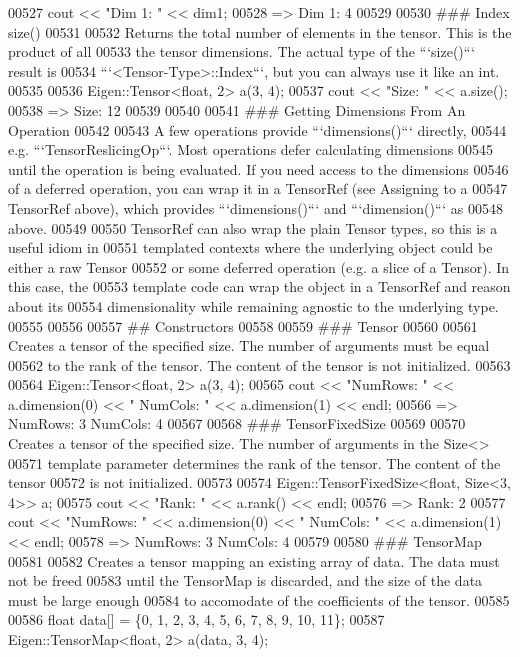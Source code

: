 \begin{DoxyCode}
00527       cout << "Dim 1: " << dim1;
00528       => Dim 1: 4
00529 
00530 ### Index size()
00531 
00532 Returns the total number of elements in the tensor.  This is the product of all
00533 the tensor dimensions.  The actual type of the ```size()``` result is
00534 ```<Tensor-Type>::Index```, but you can always use it like an int.
00535 
00536     Eigen::Tensor<float, 2> a(3, 4);
00537     cout << "Size: " << a.size();
00538     => Size: 12
00539 
00540 
00541 ### Getting Dimensions From An Operation
00542 
00543 A few operations provide ```dimensions()``` directly,
00544 e.g. ```TensorReslicingOp```.  Most operations defer calculating dimensions
00545 until the operation is being evaluated.  If you need access to the dimensions
00546 of a deferred operation, you can wrap it in a TensorRef (see Assigning to a
00547 TensorRef above), which provides ```dimensions()``` and ```dimension()``` as
00548 above.
00549 
00550 TensorRef can also wrap the plain Tensor types, so this is a useful idiom in
00551 templated contexts where the underlying object could be either a raw Tensor
00552 or some deferred operation (e.g. a slice of a Tensor).  In this case, the
00553 template code can wrap the object in a TensorRef and reason about its
00554 dimensionality while remaining agnostic to the underlying type.
00555 
00556 
00557 ## Constructors
00558 
00559 ### Tensor
00560 
00561 Creates a tensor of the specified size. The number of arguments must be equal
00562 to the rank of the tensor. The content of the tensor is not initialized.
00563 
00564     Eigen::Tensor<float, 2> a(3, 4);
00565     cout << "NumRows: " << a.dimension(0) << " NumCols: " << a.dimension(1) << endl;
00566     => NumRows: 3 NumCols: 4
00567 
00568 ### TensorFixedSize
00569 
00570 Creates a tensor of the specified size. The number of arguments in the Size<>
00571 template parameter determines the rank of the tensor. The content of the tensor
00572 is not initialized.
00573 
00574     Eigen::TensorFixedSize<float, Size<3, 4>> a;
00575     cout << "Rank: " << a.rank() << endl;
00576     => Rank: 2
00577     cout << "NumRows: " << a.dimension(0) << " NumCols: " << a.dimension(1) << endl;
00578     => NumRows: 3 NumCols: 4
00579 
00580 ### TensorMap
00581 
00582 Creates a tensor mapping an existing array of data. The data must not be freed
00583 until the TensorMap is discarded, and the size of the data must be large enough
00584 to accomodate of the coefficients of the tensor.
00585 
00586     float data[] = \{0, 1, 2, 3, 4, 5, 6, 7, 8, 9, 10, 11\};
00587     Eigen::TensorMap<float, 2> a(data, 3, 4);

\end{DoxyCode}
